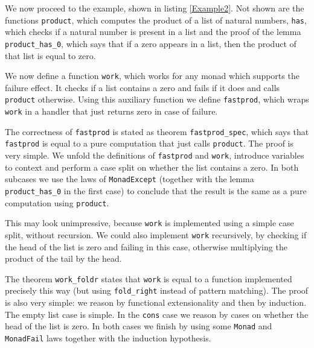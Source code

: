 \documentclass[declaration,inz,english,shortabstract]{iithesis}
\newcommand{\m}[1]{\texttt{#1}}
\begin{document}

We now proceed to the example, shown in listing \ref{Example2}. Not shown are the functions \m{product}, which computes the product of a list of natural numbers, \m{has}, which checks if a natural number is present in a list and the proof of the lemma \m{product\_has\_0}, which says that if a zero appears in a list, then the product of that list is equal to zero.

We now define a function \m{work}, which works for any monad which supports the failure effect. It checks if a list contains a zero and fails if it does and calls \m{product} otherwise. Using this auxiliary function we define \m{fastprod}, which wraps \m{work} in a handler that just returns zero in case of failure.

The correctness of \m{fastprod} is stated as theorem \m{fastprod\_spec}, which says that \m{fastprod} is equal to a pure computation that just calls \m{product}. The proof is very simple. We unfold the definitions of \m{fastprod} and \m{work}, introduce variables to context and perform a case split on whether the list contains a zero. In both subcases we use the laws of \m{MonadExcept} (together with the lemma \m{product\_has\_0} in the first case) to conclude that the result is the same as a pure computation using \m{product}.

This may look unimpressive, because \m{work} is implemented using a simple case split, without recursion. We could also implement \m{work} recursively, by checking if the head of the list is zero and failing in this case, otherwise multiplying the product of the tail by the head.

The theorem \m{work\_foldr} states that \m{work} is equal to a function implemented precisely this way (but using \m{fold\_right} instead of pattern matching). The proof is also very simple: we reason by functional extensionality and then by induction. The empty list case is simple. In the \m{cons} case we reason by cases on whether the head of the list is zero. In both cases we finish by using some \m{Monad} and \m{MonadFail} laws together with the induction hypothesis.
\end{document}

